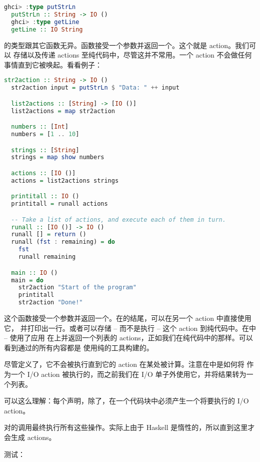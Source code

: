 \documentclass[./main.tex]{subfiles}
\begin{document}
\begin{lstlisting}[language=Haskell]
  ghci> :type putStrLn
  putStrLn :: String -> IO ()
  ghci> :type getLine
  getLine :: IO String
\end{lstlisting}

的类型跟其它函数无异。函数接受一个参数并返回一个。这个就是 action。我们可以
存储以及传递 actions 至纯代码中，尽管这并不常用。一个 action 不会做任何事情直到它被唤起。看看例子：

\begin{lstlisting}[language=Haskell]
  str2action :: String -> IO ()
  str2action input = putStrLn $ "Data: " ++ input

  list2actions :: [String] -> [IO ()]
  list2actions = map str2action

  numbers :: [Int]
  numbers = [1 .. 10]

  strings :: [String]
  strings = map show numbers

  actions :: [IO ()]
  actions = list2actions strings

  printitall :: IO ()
  printitall = runall actions

  -- Take a list of actions, and execute each of them in turn.
  runall :: [IO ()] -> IO ()
  runall [] = return ()
  runall (fst : remaining) = do
    fst
    runall remaining

  main :: IO ()
  main = do
    str2action "Start of the program"
    printitall
    str2action "Done!"
\end{lstlisting}

这个函数接受一个参数并返回一个。在的结尾，可以在另一个 action 中直接使用它，
并打印出一行。或者可以存储 -- 而不是执行 -- 这个 action 到纯代码中。在中 -- 使用了应用
在上并返回一个列表的 actions，正如我们在纯代码中的那样。可以看到通过的所有内容都是
使用纯的工具构建的。

尽管定义了，它不会被执行直到它的 action 在某处被计算。注意在中是如何将
作为一个 I/O action 被执行的，而之前我们在 I/O 单子外使用它，并将结果转为一个列表。

可以这么理解：每个声明，除了，在一个代码块中必须产生一个将要执行的 I/O action。

对的调用最终执行所有这些操作。实际上由于 Haskell 是惰性的，所以直到这里才会生成 actions。

测试：
\end{document}
